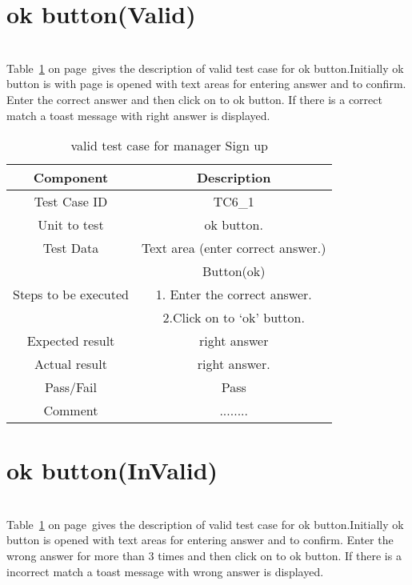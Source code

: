 \section{ok button(Valid)}
\hspace{1cm} \\
Table~\ref{table:tc11} on
page~\pageref{table:tc11}gives the description of valid test case for ok button.Initially ok button is with page is opened with  text areas for entering answer and to confirm. Enter the correct answer and  then click on to ok button.  If there is a correct match a toast message with right answer is displayed.\\
\vspace{10cm}
\begin{table}[htb!]
\label{table : tc11}
\centering %
\begin{tabular}{c c} %
\hline\hline %
 Component & Description \\ [0.5ex] %
\hline %
Test Case ID & TC6\_1   \\
Unit to test &ok button. \\ 
Test Data &Text area (enter correct answer.)\\
&Button(ok)\\
Steps to be executed &1. Enter the correct answer.\\
&2.Click on to ‘ok’ button.\\
Expected result  &right answer\\ 
Actual result &right answer.\\
Pass/Fail &Pass\\
Comment &........\\

\hline %
\end{tabular}
\caption{valid test case for manager Sign up} \label{table:tc11} %
\end{table}

\section{ok button(InValid)}
\hspace{1cm} \\
Table~\ref{table:tc11} on
page~\pageref{table:tc11}gives the description of valid test case for ok button.Initially ok button  is opened with  text areas for entering answer and to confirm. Enter the wrong  answer for more than 3 times and  then click on to ok button.  If there is a incorrect match a toast message with wrong  answer is displayed.\\

